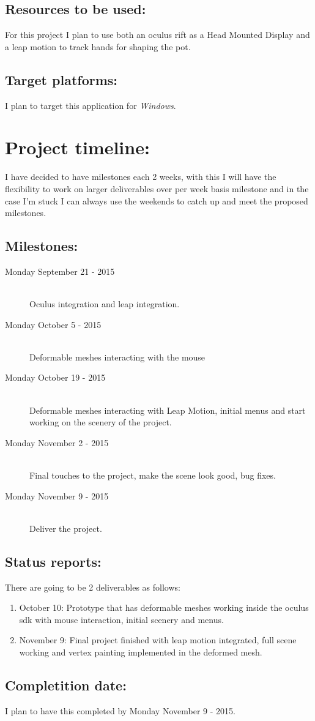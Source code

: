 \documentclass{article}
\begin{document}
\subsection{Resources to be used:}
For this project I plan to use both an oculus rift as a Head Mounted Display
and a leap motion to track hands for shaping the pot.
\subsection{Target platforms:}
I plan to target this application for \textit{Windows}.
\section{Project timeline:}
I have decided to have milestones each 2 weeks, with this I will have the
flexibility to work on larger deliverables over per week basis milestone and
in the case I'm stuck I can always use the weekends to catch up and meet the
proposed milestones.
\subsection{Milestones:}
\begin{description}
  \item[Monday September 21 - 2015] \hfill \\
    Oculus integration and leap integration.
  \item[Monday October 5 - 2015] \hfill \\
    Deformable meshes interacting with the mouse
  \item[Monday October 19 - 2015] \hfill \\
    Deformable meshes interacting with Leap Motion, initial menus and start working on the scenery of the project.
  \item[Monday November 2 - 2015] \hfill \\
    Final touches to the project, make the scene look good, bug fixes.
  \item[Monday November 9 - 2015] \hfill \\
    Deliver the project.
\end{description}
\subsection{Status reports:}
There are going to be 2 deliverables as follows:
\begin{enumerate}
  \item October 10: Prototype that has deformable meshes working inside the
    oculus sdk with mouse interaction, initial scenery and menus.
  \item November 9: Final project finished with leap motion integrated, full
    scene working and vertex painting implemented in the deformed mesh.
\end{enumerate}
\subsection{Completition date:}
I plan to have this completed by Monday November 9 - 2015.
\end{document}
